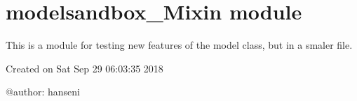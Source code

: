 \documentclass[letterpaper,10pt,english]{sphinxmanual}
\begin{document}
\sphinxstepscope


\section{modelsandbox\_Mixin module}
\label{\detokenize{unsorted/modelsandbox_Mixin:module-modelsandbox_Mixin}}\label{\detokenize{unsorted/modelsandbox_Mixin:modelsandbox-mixin-module}}\label{\detokenize{unsorted/modelsandbox_Mixin::doc}}
\sphinxAtStartPar
This is a module for testing new features of the model class, but in a smaler file.

\sphinxAtStartPar
Created on Sat Sep 29 06:03:35 2018

\sphinxAtStartPar
@author: hanseni
\end{document}

